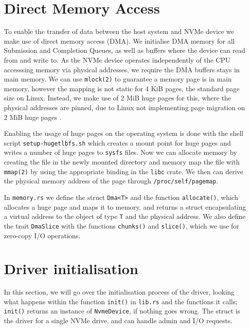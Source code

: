 \section{Direct Memory Access}
To enable the transfer of data between the host system and NVMe device we make use of direct memory access (DMA). We initialise DMA memory for all Submission and Completion Queues, as well as buffers where the device can read from and write to. As the NVMe device operates independently of the CPU accesssing memory via physical addresses, we require the DMA buffers stays in main memory. We can use \texttt{mlock(2)} to guarantee a memory page is in main memory, however the mapping is not static for 4 KiB pages, the standard page size on Linux. Instead, we make use of 2 MiB huge pages for this, where the physical addresses are pinned, due to Linux not implementing page migration on 2 MiB huge pages \cite{user_space_net}.

Enabling the usage of huge pages on the operating system is done with the shell script \texttt{setup-hugetlbfs.sh} which creates a mount point for huge pages and writes a number of huge pages to \texttt{sysfs} files. Now we can allocate memory by creating the file in the newly mounted directory and memory map the file with \texttt{mmap(2)} by using the appropriate binding in the \texttt{libc} crate. We then can derive the physical memory address of the page through \texttt{/proc/self/pagemap}.

In \texttt{memory.rs} we define the struct \texttt{Dma<T>} and the function \texttt{allocate()}, which allocates a huge page and maps it to memory, and returns a struct encapsulating a virtual address to the object of type \texttt{T} and the physical address. We also define the trait \texttt{DmaSlice} with the functions \texttt{chunks()} and \texttt{slice()}, which we use for zero-copy I/O operations.


\section{Driver initialisation}
In this section, we will go over the initialisation process of the driver, looking what happens within the function \texttt{init()} in \texttt{lib.rs} and the functions it calls; \texttt{init()} returns an instance of \texttt{NvmeDevice}, if nothing goes wrong. The struct is the driver for a single NVMe drive, and can handle admin and I/O requests.

